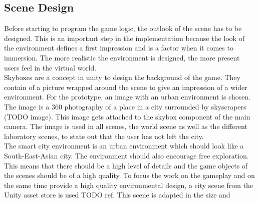\subsection{Scene Design}
Before starting to program the game logic, the outlook of the scene has to be designed. This is an important step in the implementation because the look of the environment defines a first impression and is a factor when it comes to immersion. The more realistic the environment is designed, the more present users feel in the virtual world.\\
Skyboxes are a concept in unity to design the background of the game. They contain of a picture wrapped around the scene to give an impression of a wider environment. 
For the prototype, an image with an urban environment is chosen. The image is a 360 photography of a place in a city surrounded by skyscrapers (TODO image). This image gets attached to the skybox component of the main camera. The image is used in all scenes, the world scene as well as the different laboratory scenes, to state out that the user has not left the city. \\
The smart city environment is an urban environment which should look like a South-East-Asian city. The environment should also encourage free exploration. This means that there should be a high level of details and the game objects of the scenes should be of a high quality. To focus the work on the gameplay and on the same time provide a high quality environmental design, a city scene from the Unity asset store is used TODO ref. This scene is adapted in the size and  
